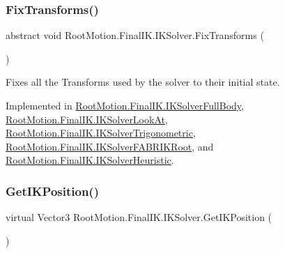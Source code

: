\subsubsection{\texorpdfstring{Fix\+Transforms()}{FixTransforms()}}
{\footnotesize\ttfamily abstract void Root\+Motion.\+Final\+I\+K.\+I\+K\+Solver.\+Fix\+Transforms (\begin{DoxyParamCaption}{ }\end{DoxyParamCaption})\hspace{0.3cm}{\ttfamily [pure virtual]}}



Fixes all the Transforms used by the solver to their initial state. 



Implemented in \mbox{\hyperlink{class_root_motion_1_1_final_i_k_1_1_i_k_solver_full_body_ad2db122b4977cefd66fad54e26d38671}{Root\+Motion.\+Final\+I\+K.\+I\+K\+Solver\+Full\+Body}}, \mbox{\hyperlink{class_root_motion_1_1_final_i_k_1_1_i_k_solver_look_at_afc01280e8f1020cd817748b235f384c4}{Root\+Motion.\+Final\+I\+K.\+I\+K\+Solver\+Look\+At}}, \mbox{\hyperlink{class_root_motion_1_1_final_i_k_1_1_i_k_solver_trigonometric_a46aa3acfba8c4c23dc23f00f29249d90}{Root\+Motion.\+Final\+I\+K.\+I\+K\+Solver\+Trigonometric}}, \mbox{\hyperlink{class_root_motion_1_1_final_i_k_1_1_i_k_solver_f_a_b_r_i_k_root_a174767501bc62dd1fb760e35a01a6ab0}{Root\+Motion.\+Final\+I\+K.\+I\+K\+Solver\+F\+A\+B\+R\+I\+K\+Root}}, and \mbox{\hyperlink{class_root_motion_1_1_final_i_k_1_1_i_k_solver_heuristic_a8cd9cbe3bd3bd871cc288e4ef7da4f33}{Root\+Motion.\+Final\+I\+K.\+I\+K\+Solver\+Heuristic}}.

\mbox{\label{class_root_motion_1_1_final_i_k_1_1_i_k_solver_aed08007156944c206abc59fa8da029ab}} 
\subsubsection{\texorpdfstring{Get\+I\+K\+Position()}{GetIKPosition()}}
{\footnotesize\ttfamily virtual Vector3 Root\+Motion.\+Final\+I\+K.\+I\+K\+Solver.\+Get\+I\+K\+Position (\begin{DoxyParamCaption}{ }\end{DoxyParamCaption})\hspace{0.3cm}{\ttfamily [virtual]}}




